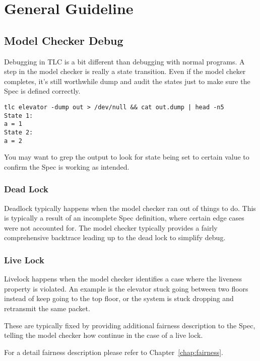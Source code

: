 \chapter{General Guideline}

\section{Model Checker Debug}

Debugging in TLC is a bit different than debugging with normal programs. A step
in the model checker is really a state transition. Even if the model cheker
completes, it's still worthwhile dump and audit the states just to make sure the
Spec is defined correctly.

\begin{verbatim}
tlc elevator -dump out > /dev/null && cat out.dump | head -n5
State 1:
a = 1
State 2:
a = 2
\end{verbatim}

You may want to grep the output to look for state being set to certain value to 
confirm the Spec is working as intended.

\subsection{Dead Lock}

Deadlock typically happens when the model checker ran out of things to do. This
is typically a result of an incomplete Spec definition, where certain edge cases
were not accounted for. The model checker typically provides a fairly
comprehensive backtrace leading up to the dead lock to simplify debug.

\subsection{Live Lock}

Livelock happens when the model checker identifies a case where the liveness
property is violated. An example is the elevator stuck going between two floors 
instead of keep going to the top floor, or the system is stuck dropping and
retransmit the same packet.\newline 

These are typically fixed by providing additional fairness description to the
Spec, telling the model checker how continue in the case of a live lock.\newline 

For a detail fairness description please refer to Chapter~\ref{chap:fairness}.

